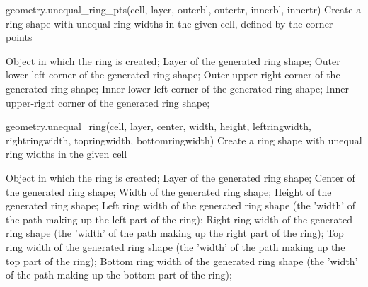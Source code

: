 \begin{APIfunc}{geometry.unequal\_ring\_pts(cell, layer, outerbl, outertr, innerbl, innertr)}
    Create a ring shape with unequal ring widths in the given cell, defined by the corner points
    \begin{APIparameters}
            Object in which the ring is created;
            Layer of the generated ring shape;
            Outer lower-left corner of the generated ring shape;
            Outer upper-right corner of the generated ring shape;
            Inner lower-left corner of the generated ring shape;
            Inner upper-right corner of the generated ring shape;
    \end{APIparameters}
\end{APIfunc}
\begin{APIfunc}{geometry.unequal\_ring(cell, layer, center, width, height, leftringwidth, rightringwidth, topringwidth, bottomringwidth)}
    Create a ring shape with unequal ring widths in the given cell
    \begin{APIparameters}
            Object in which the ring is created;
            Layer of the generated ring shape;
            Center of the generated ring shape;
            Width of the generated ring shape;
            Height of the generated ring shape;
            Left ring width of the generated ring shape (the 'width' of the path making up the left part of the ring);
            Right ring width of the generated ring shape (the 'width' of the path making up the right part of the ring);
            Top ring width of the generated ring shape (the 'width' of the path making up the top part of the ring);
            Bottom ring width of the generated ring shape (the 'width' of the path making up the bottom part of the ring);
    \end{APIparameters}
\end{APIfunc}
